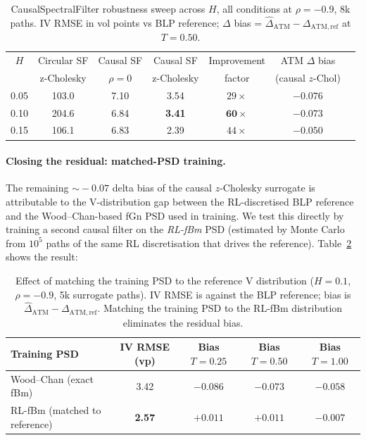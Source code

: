 \documentclass[11pt,a4paper]{article}
\begin{document}
\begin{table}[h]
\centering
\caption{CausalSpectralFilter robustness sweep across $H$, all conditions
at $\rho=-0.9$, 8k paths. IV RMSE in vol points vs BLP reference;
$\Delta$ bias = $\hat\Delta_{\mathrm{ATM}} - \Delta_{\mathrm{ATM,ref}}$ at $T=0.50$.}
\label{tab:causal-hurst}
\begin{tabular}{ccccccc}
\toprule
$H$ & Circular SF & Causal SF & Causal SF & Improvement & ATM $\Delta$ bias \\
  & z-Cholesky & $\rho=0$ & z-Cholesky & factor   & (causal $z$-Chol) \\
\midrule
0.05 & 103.0 & 7.10 & 3.54 & $29\times$ & $-0.076$ \\
0.10 & 204.6 & 6.84 & \textbf{3.41} & $\mathbf{60\times}$ & $-0.073$ \\
0.15 & 106.1 & 6.83 & 2.39 & $44\times$ & $-0.050$ \\
\bottomrule
\end{tabular}
\end{table}

\paragraph{Closing the residual: matched-PSD training.}
The remaining $\sim\!-0.07$ delta bias of the causal $z$-Cholesky
surrogate is attributable to the V-distribution gap between the
RL-discretised BLP reference and the Wood--Chan-based fGn PSD used in
training. We test this directly by training a second causal filter on
the \emph{RL-fBm} PSD (estimated by Monte Carlo from $10^5$ paths of the
same RL discretisation that drives the reference). Table~\ref{tab:rl-match}
shows the result:

\begin{table}[h]
\centering
\caption{Effect of matching the training PSD to the reference V
distribution ($H=0.1$, $\rho=-0.9$, 5k surrogate paths). IV RMSE is
against the BLP reference; bias is
$\hat\Delta_{\mathrm{ATM}} - \Delta_{\mathrm{ATM,ref}}$. Matching the
training PSD to the RL-fBm distribution eliminates the residual bias.}
\label{tab:rl-match}
\begin{tabular}{lcccc}
\toprule
Training PSD & IV RMSE (vp) & Bias $T=0.25$ & Bias $T=0.50$ & Bias $T=1.00$ \\
\midrule
Wood--Chan (exact fBm)     & 3.42 & $-0.086$ & $-0.073$ & $-0.058$ \\
RL-fBm (matched to reference) & \textbf{2.57} & \textbf{$+0.011$} & \textbf{$+0.011$} & \textbf{$-0.007$} \\
\bottomrule
\end{tabular}
\end{table}
\end{document}

